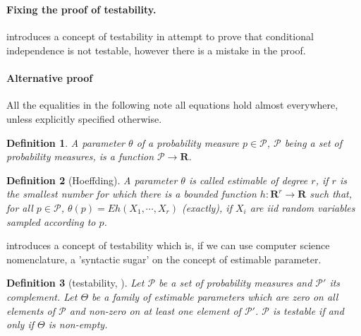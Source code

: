 \documentclass{article}
\title{}
\author{KC}
\date{}
\newtheorem{definition}{Definition}
\begin{document}
\maketitle

\section{}


\paragraph{Fixing the proof of testability.}
\cite{bergsma2004testing} introduces a concept of testability in attempt to prove that conditional independence is not testable, however there is a mistake in the proof.



\paragraph{Alternative proof}
All the equalities in the following note all equations hold almost everywhere, unless explicitly specified otherwise.
\begin{definition}
 A parameter  $\theta$ of a probability measure $p \in \mathcal P$, $\mathcal P$ being a set of probability measures, is a function $\mathcal P  \to  \mathbf R$.   
\end{definition}


\begin{definition}[Hoeffding]
A parameter  $\theta$ is called estimable of degree $r$, if $r$ is the smallest number for which there is a bounded function $h : \mathbf R^{r} \to \mathbf R$ such that, for all $p \in \mathcal P$, $ \theta(p) = Eh(X_1, \cdots , X_r)$ (exactly),  if $X_i$ are iid random variables sampled according to $p$.
\end{definition}

\cite{bergsma2004testing} introduces a concept of testability which is, if we can use computer science nomenclature, a 'syntactic sugar' on the concept of estimable parameter.

\begin{definition}[testability, \cite{bergsma2004testing}]
 Let $\mathcal{P}$ be a set of probability measures and $\mathcal{P}'$ its complement. Let $\Theta$ be a family of estimable parameters which are zero on all elements of $\mathcal{P}$ and non-zero on at least one element of $\mathcal{P}'$.  $\mathcal{P}$ is testable if and only if $\Theta$ is non-empty.    
\end{definition}
\end{document}
